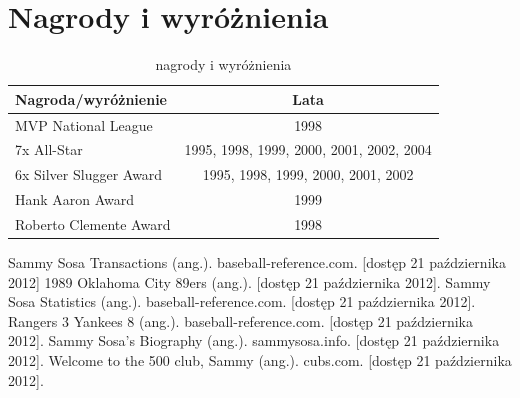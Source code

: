 \documentclass[a4paper,12pt]{article}
\begin{document}
\section{Nagrody i wyróżnienia}
\begin{table}[h]
	\begin{tabular}{lc}
	\textbf{Nagroda/wyróżnienie}&\textbf{Lata}\\
	\hline
	MVP National League&1998\\
	7x All-Star&1995{, }1998{, }1999{, }2000{, }2001{, }2002{, }2004\\
	6x Silver Slugger Award&1995{, }1998{, }1999{, }2000{, }2001{, }2002\\
	Hank Aaron Award&1999\\
	Roberto Clemente Award&1998\\
	\hline
	\end{tabular}
\caption{nagrody i wyróżnienia}
\end{table}

\begin{thebibliography}{6}
Sammy Sosa Transactions (ang.). baseball-reference.com. [dostęp 21 października 2012]
1989 Oklahoma City 89ers (ang.). [dostęp 21 października 2012].
Sammy Sosa Statistics (ang.). baseball-reference.com. [dostęp 21 października 2012].
Rangers 3 Yankees 8 (ang.). baseball-reference.com. [dostęp 21 października 2012].
Sammy Sosa's Biography (ang.). sammysosa.info. [dostęp 21 października 2012].
Welcome to the 500 club, Sammy (ang.). cubs.com. [dostęp 21 października 2012].
\end{thebibliography}
\end{document}
